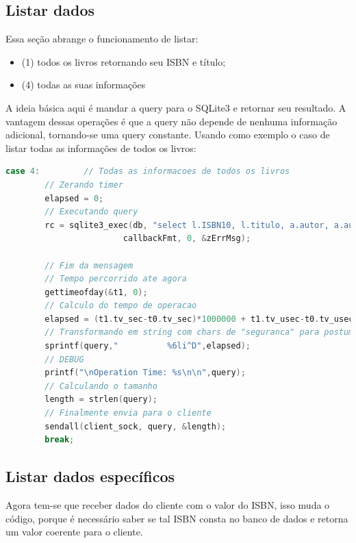 \documentclass[10pt,a4paper]{report}
\begin{document}
\subsection{Listar dados}
Essa seção abrange o funcionamento de listar:
\begin{itemize}
\item (1) todos os livros retornando seu ISBN e título;
\item (4) todas as suas informações
\end{itemize}
A ideia básica aqui é mandar a query para o SQLite3 e retornar seu resultado.
A vantagem dessas operações é que a query não depende de nenhuma informação adicional, tornando-se uma query constante.
Usando como exemplo o caso de listar todas as informações de todos os livros:
\begin{lstlisting}[language=C]
case 4:         // Todas as informacoes de todos os livros
        // Zerando timer
        elapsed = 0;
        // Executando query
        rc = sqlite3_exec(db, "select l.ISBN10, l.titulo, a.autor, a.autor2, a.autor3, a.autor4, l.descricao, l.editora, l.ano, l.estoque from livro l, autor a where l.autores=a.a_id;",
                        callbackFmt, 0, &zErrMsg);

        // Fim da mensagem
        // Tempo percorrido ate agora
        gettimeofday(&t1, 0); 
        // Calculo do tempo de operacao
        elapsed = (t1.tv_sec-t0.tv_sec)*1000000 + t1.tv_usec-t0.tv_usec;
        // Transformando em string com chars de "seguranca" para postumo atoi
        sprintf(query,"          %6li^D",elapsed);
        // DEBUG
        printf("\nOperation Time: %s\n\n",query);
        // Calculando o tamanho
        length = strlen(query);
        // Finalmente envia para o cliente
        sendall(client_sock, query, &length);
        break;
\end{lstlisting}
\subsection{Listar dados específicos}
Agora tem-se que receber dados do cliente com o valor do ISBN, isso muda o código, porque é necessário saber se tal ISBN consta no banco de dados e retorna um valor coerente para o cliente.
\end{document}
